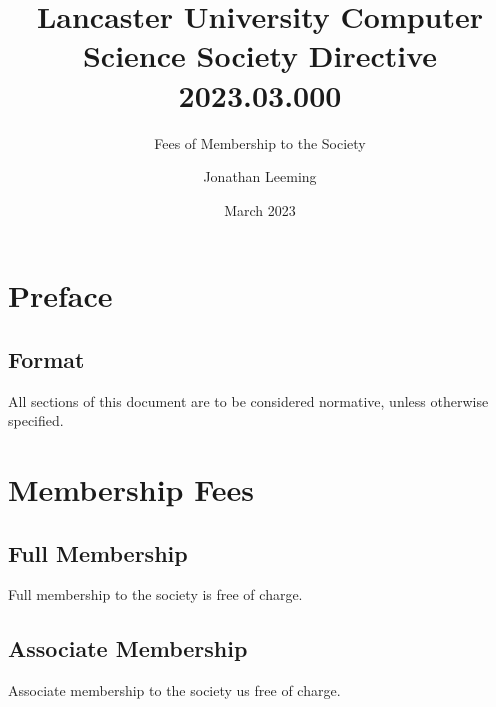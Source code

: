 \documentclass{scrartcl}
\title{Lancaster University Computer Science Society Directive 2023.03.000}
\subtitle{Fees of Membership to the Society}
\author{Jonathan Leeming}
\date{March 2023}
\begin{document}
    \maketitle
    
    \clearpage
    \tableofcontents

    \clearpage
    \section{Preface}
        \label{preface}
        \subsection{Format}
            \label{preface--format}
            All sections of this document are to be considered normative, unless otherwise specified.

    \section{Membership Fees}
        \label{fees}
        \subsection{Full Membership}
            \label{fees--full}
            Full membership to the society is free of charge.

        \subsection{Associate Membership}
            \label{fees-associate}
            Associate membership to the society us free of charge.
    \clearpage
\end{document}
